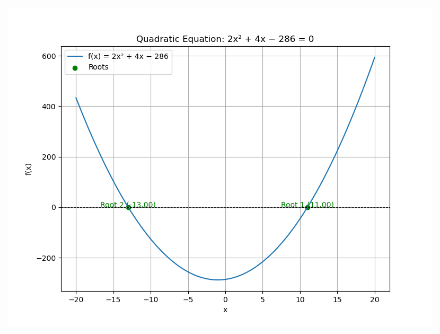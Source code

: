 \documentclass[journal]{IEEEtran}
\begin{document}
\begin{figure}[h!]
   \centering
   \includegraphics[width=0.7\linewidth]{figs/Figure_1.png}
\end{figure}
		
		
\end{document}
